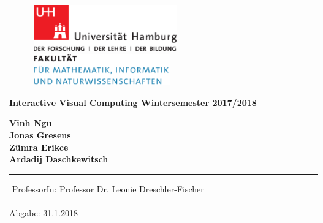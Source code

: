 \begin{titlepage}

  \setcounter{page}{-1}

	\begin{figure}[h]
		\begin{minipage}[b]{62mm}
			\includegraphics[width=62mm]{images/unilogo}
		\end{minipage}
		\hspace{4cm}
		\begin{minipage}[b]{59mm}
			\includegraphics[width=59mm]{images/minlogo}
		\end{minipage}
	\end{figure}

	\vfill
	
	\begin{center}
		\vspace{14mm}
		\noindent \textbf{\huge
		  Interactive Visual Computing Wintersemester 2017/2018
		}
		\vspace{60mm}	
	\end{center}
	
	\vfill
	\noindent \textbf{Vinh Ngu} \\
	\noindent \textbf{Jonas Gresens} \\
	\noindent \textbf{Zümra Erikce} \\
	\noindent \textbf{ Ardadij Daschkewitsch} \\
	\noindent \rule{\textwidth}{0.4mm} 

	\begin{tabbing}
	\hspace{8em} \=  \kill
	ProfessorIn: \> Professor Dr. Leonie Dreschler-Fischer\\

	~ \\
	Abgabe: 31.1.2018
	\end{tabbing}
	
	\thispagestyle{empty}
	\setcounter{page}{0}

\end{titlepage}

